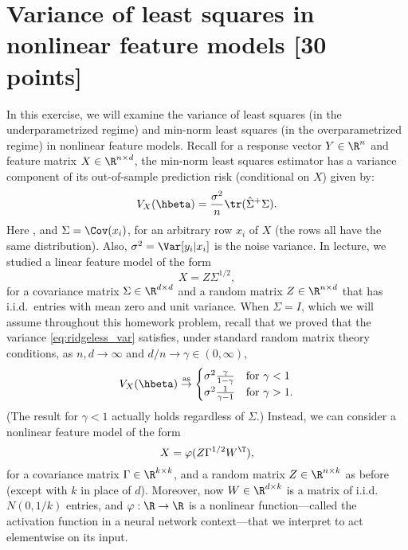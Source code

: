 \documentclass{article}
\begin{document}
\section{Variance of least squares in nonlinear feature models [30 points]} 

\def\asto{\overset{\mathrm{as}}{\to}}
\def\hSigma{\hat\Sigma}

In this exercise, we will examine the variance of least squares (in the
underparametrized regime) and min-norm least squares (in the overparametrized 
regime) in nonlinear feature models. Recall for a response vector $Y \in \R^n$
and feature matrix $X \in \R^{n \times d}$, the min-norm least squares estimator 
 has a variance component of its
out-of-sample prediction risk (conditional on $X$) given by:
\begin{equation}
\label{eq:ridgeless_var}
V_X(\hbeta) = \frac{\sigma^2}{n} \tr (\hSigma^+ \Sigma).
\end{equation}
Here \smash{$\hSigma = X^\T X/n$}, and $\Sigma = \Cov(x_i)$, for an arbitrary
row $x_i$ of $X$ (the rows all have the same distribution). Also, $\sigma^2 =
\Var[y_i | x_i]$ is the noise variance. In lecture, we studied a linear feature 
model of the form    
\begin{equation}
\label{eq:linear_features}
X = Z \Sigma^{1/2},
\end{equation}
for a covariance matrix $\Sigma \in \R^{d \times d}$ and a random matrix $Z \in
\R^{n \times d}$ that has i.i.d.\ entries with mean zero and unit variance. When
$\Sigma = I$, which we will assume throughout this homework problem, recall that
we proved that the variance \eqref{eq:ridgeless_var} satisfies, under standard 
random matrix theory conditions, as $n,d \to \infty$ and $d/n \to \gamma \in 
(0,\infty)$, 
\begin{equation}
\label{eq:ridgeless_var_iso_limit}
V_X(\hbeta) \asto 
\begin{cases}
\sigma^2 \frac{\gamma}{1-\gamma} & \text{for $\gamma < 1$} \\ 
\sigma^2 \frac{1}{\gamma-1} & \text{for $\gamma > 1$}.
\end{cases}
\end{equation}
(The result for $\gamma < 1$ actually holds regardless of $\Sigma$.) Instead, we
can consider a nonlinear feature model of the form 
\begin{equation}
\label{eq:nonlinear_features}
X = \varphi(Z \Gamma^{1/2} W^\T),
\end{equation}
for a covariance matrix $\Gamma \in \R^{k \times k}$, and a random matrix $Z \in
\R^{n \times k}$ as before (except with $k$ in place of $d$). Moreover, now $W
\in \R^{d \times k}$ is a matrix of i.i.d.\ $N(0,1/k)$ entries, and $\varphi :
\R \to \R$ is a nonlinear function---called the activation function in a neural
network context---that we interpret to act elementwise on its input. 
\end{document}

